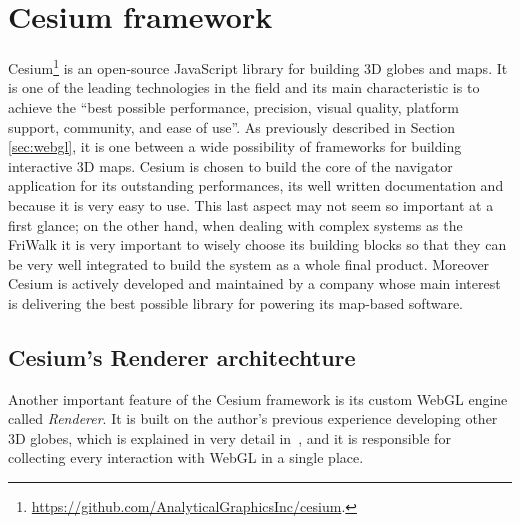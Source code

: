 \section{Cesium framework} \label{sec:cesium}
Cesium\footnote{\url{https://github.com/AnalyticalGraphicsInc/cesium}.} is an
open-source JavaScript library for building 3D globes and maps.
It is one of the leading technologies in the
field and its main characteristic is to achieve the ``best possible performance,
precision, visual quality, platform support, community, and ease of use''.
As previously described in Section \ref{sec:webgl}, it is one between a wide
possibility of frameworks for building interactive 3D maps. Cesium is chosen to
build the core of the navigator application for its outstanding performances,
its well written documentation and because it is very easy to use. This last aspect
may not seem so important at a first glance; on the other hand, when dealing with
complex systems as the FriWalk it is very important to wisely choose its building
blocks so that they can be very well integrated to build the system as a whole
final product. Moreover Cesium is actively developed and maintained by a company
whose main interest is delivering the best possible library for powering its
map-based software.

\subsection{Cesium's Renderer architechture}
Another important feature of the Cesium framework is its custom WebGL engine called
\emph{Renderer}. It is built on the author's previous experience developing
other 3D globes, which is explained in very detail in~\cite{cozzi20113d}, and it
is responsible for collecting every interaction with WebGL in a single place.

